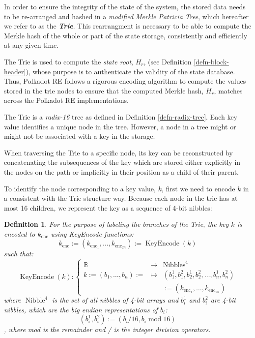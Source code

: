 \documentclass{article}
\newcommand{\assign}{:=}
\newcommand{\nosymbol}{}
\newcommand{\tmem}[1]{{\em #1\/}}
\newcommand{\tmop}[1]{\ensuremath{\operatorname{#1}}}
\newcommand{\tmstrong}[1]{\textbf{#1}}
\newcommand{\tmtextbf}[1]{{\bfseries{#1}}}
\newcommand{\tmtextit}[1]{{\itshape{#1}}}
\newtheorem{definition}{Definition}
\providecommand{\nosymbol}{}
\providecommand{\tmem}[1]{\tmtextit{#1}}
\providecommand{\tmop}[1]{\ensuremath{\mathrm{#1}}}
\providecommand{\tmstrong}[1]{\tmtextbf{#1}}
\providecommand{\tmtextbf}[1]{\tmtextbf{#1}}
\providecommand{\tmtextit}[1]{\tmtextit{#1}}
\newtheorem{definition}{Definition}
\begin{document}
In order to ensure the integrity of the state of the system, the stored data
needs to be re-arranged and hashed in a {\tmem{modified Merkle Patricia
Tree}}, which hereafter we refer to as the {\tmem{{\tmstrong{Trie}}}}. This
rearrangment is necessary to be able to compute the Merkle hash of the whole
or part of the state storage, consistently and efficiently at any given time.

The Trie is used to compute the {\tmem{state root}}, $H_r$, (see Definition
\ref{defn-block-header}), whose purpose is to authenticate the validity of the
state database. Thus, Polkadot RE follows a rigorous encoding algorithm to
compute the values stored in the trie nodes to ensure that the computed Merkle
hash, $H_r$, matches across the Polkadot RE implementations.

The Trie is a {\tmem{radix-16}} tree as defined in Definition
\ref{defn-radix-tree}. Each key value identifies a unique node in the tree.
However, a node in a tree might or might not be associated with a key in the
storage.

When traversing the Trie to a specific node, its key can be reconstructed by
concatenating the subsequences of the key which are stored either explicitly
in the nodes on the path or implicitly in their position as a child of their
parent.

To identify the node corresponding to a key value, $k$, first we need to
encode $k$ in a consistent with the Trie structure way. Because each node in
the trie has at most 16 children, we represent the key as a sequence of 4-bit
nibbles:

\begin{definition}
  For the purpose of labeling the branches of the Trie, the key $k$ is encoded
  to $k_{\tmop{enc}}$ using KeyEncode functions:
  \begin{equation}
    k_{\tmop{enc}} \assign (k_{\tmop{enc}_1}, \ldots, k_{\tmop{enc}_{2 n}})
    \assign \tmop{KeyEncode} (k) \label{key-encode-in-trie}
  \end{equation}
  such that:
  \[ \tmop{KeyEncode} (k) : \left\{ \begin{array}{lll}
       \mathbb{B}^{\nosymbol} & \rightarrow & \tmop{Nibbles}^4\\
       k \assign (b_1, \ldots, b_n) \assign & \mapsto & (b^1_1, b^2_1, b_2^1,
       b^2_2, \ldots, b^1_n, b^2_n)\\
       &  & \assign (k_{\tmop{enc}_1}, \ldots, k_{\tmop{enc}_{2 n}})
     \end{array} \right. \]
  where $\tmop{Nibble}^4$ is the set of all nibbles of 4-bit arrays and
  $b^1_i$ and $b^2_i$ are 4-bit nibbles, which are the big endian
  representations of $b_i$:
  \[ (b^1_i, b^2_i) \assign (b_i / 16, b_i \tmop{mod} 16) \]
  , where mod is the remainder and / is the integer division operators.
\end{definition}
\end{document}
